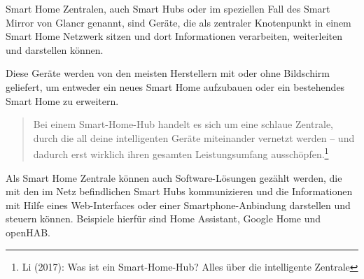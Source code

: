 \noindent Smart Home Zentralen, auch Smart Hubs oder im speziellen Fall des Smart Mirror von Glancr genannt, sind Geräte, die als zentraler Knotenpunkt in einem Smart Home Netzwerk sitzen und dort Informationen verarbeiten, weiterleiten und darstellen können.\par
\noindent Diese Geräte werden von den meisten Herstellern mit oder ohne Bildschirm geliefert, um entweder ein neues Smart Home aufzubauen oder ein bestehendes Smart Home zu erweitern. 
 	\begin{quote}
 		\color{quotetext}
 		Bei einem Smart-Home-Hub handelt es sich um eine schlaue Zentrale, durch die all deine intelligenten Geräte miteinander vernetzt werden – und dadurch erst wirklich ihren gesamten Leistungsumfang ausschöpfen.\footnote{Li (2017): Was ist ein Smart-Home-Hub? Alles über die intelligente Zentrale}
 	\end{quote}
\noindent Als Smart Home Zentrale können auch Software-Lösungen gezählt werden, die mit den im Netz befindlichen Smart Hubs kommunizieren und die Informationen mit Hilfe eines Web-Interfaces oder einer Smartphone-Anbindung darstellen und steuern können. 
Beispiele hierfür sind Home Assistant, Google Home und openHAB.\par
